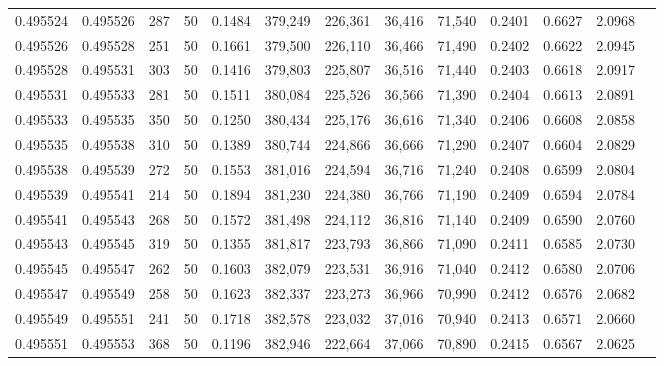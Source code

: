 \begin{tabular}{rrrrrrrrrrrrr}
0.495524 & 0.495526 &   287 &  50 &                                     0.1484 & 379,249 & 226,361 &  36,416 &  71,540 & 0.2401 & 0.6627 & 2.0968 \\
0.495526 & 0.495528 &   251 &  50 &                                     0.1661 & 379,500 & 226,110 &  36,466 &  71,490 & 0.2402 & 0.6622 & 2.0945 \\
0.495528 & 0.495531 &   303 &  50 &                                     0.1416 & 379,803 & 225,807 &  36,516 &  71,440 & 0.2403 & 0.6618 & 2.0917 \\
0.495531 & 0.495533 &   281 &  50 &                                     0.1511 & 380,084 & 225,526 &  36,566 &  71,390 & 0.2404 & 0.6613 & 2.0891 \\
0.495533 & 0.495535 &   350 &  50 &                                     0.1250 & 380,434 & 225,176 &  36,616 &  71,340 & 0.2406 & 0.6608 & 2.0858 \\
0.495535 & 0.495538 &   310 &  50 &                                     0.1389 & 380,744 & 224,866 &  36,666 &  71,290 & 0.2407 & 0.6604 & 2.0829 \\
0.495538 & 0.495539 &   272 &  50 &                                     0.1553 & 381,016 & 224,594 &  36,716 &  71,240 & 0.2408 & 0.6599 & 2.0804 \\
0.495539 & 0.495541 &   214 &  50 &                                     0.1894 & 381,230 & 224,380 &  36,766 &  71,190 & 0.2409 & 0.6594 & 2.0784 \\
0.495541 & 0.495543 &   268 &  50 &                                     0.1572 & 381,498 & 224,112 &  36,816 &  71,140 & 0.2409 & 0.6590 & 2.0760 \\
0.495543 & 0.495545 &   319 &  50 &                                     0.1355 & 381,817 & 223,793 &  36,866 &  71,090 & 0.2411 & 0.6585 & 2.0730 \\
0.495545 & 0.495547 &   262 &  50 &                                     0.1603 & 382,079 & 223,531 &  36,916 &  71,040 & 0.2412 & 0.6580 & 2.0706 \\
0.495547 & 0.495549 &   258 &  50 &                                     0.1623 & 382,337 & 223,273 &  36,966 &  70,990 & 0.2412 & 0.6576 & 2.0682 \\
0.495549 & 0.495551 &   241 &  50 &                                     0.1718 & 382,578 & 223,032 &  37,016 &  70,940 & 0.2413 & 0.6571 & 2.0660 \\
0.495551 & 0.495553 &   368 &  50 &                                     0.1196 & 382,946 & 222,664 &  37,066 &  70,890 & 0.2415 & 0.6567 & 2.0625 \\

\end{tabular}
